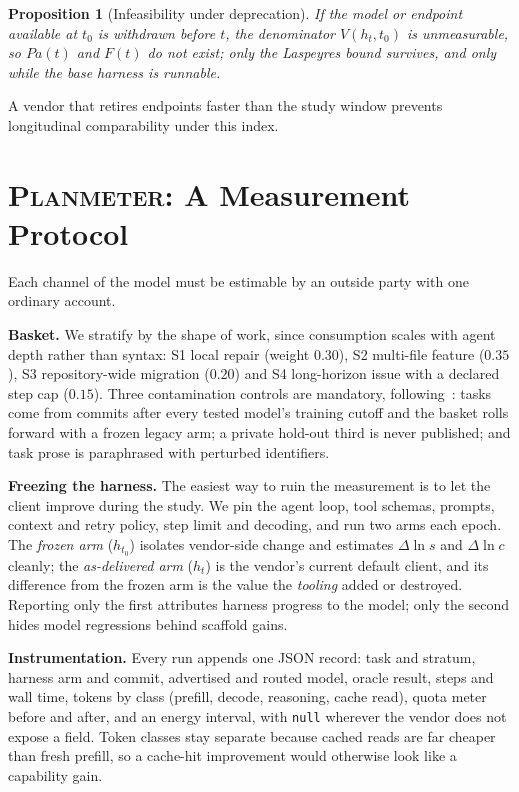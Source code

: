 \documentclass[conference]{IEEEtran}
\theoremstyle{plain}
\newtheorem{proposition}{Proposition}
\theoremstyle{definition}
\begin{document}
\begin{proposition}[Infeasibility under deprecation]
\label{prop:deprecation}
If the model or endpoint available at $t_0$ is withdrawn before $t$, the
denominator $V(h_t,t_0)$ is unmeasurable, so $Pa(t)$ and $F(t)$ do not exist;
only the Laspeyres bound survives, and only while the base harness is runnable.
\end{proposition}

A vendor that retires endpoints faster than the study window prevents
longitudinal comparability under this index.

\section{\textsc{Planmeter}: A Measurement Protocol}
\label{sec:protocol}

Each channel of the model must be estimable by an outside party with one
ordinary account.

\textbf{Basket.} We stratify by the shape of work, since consumption scales
with agent depth rather than syntax: S1 local repair (weight $0.30$), S2
multi-file feature ($0.35$), S3 repository-wide migration ($0.20$) and S4
long-horizon issue with a declared step cap ($0.15$). Three contamination
controls are mandatory, following~\cite{jain2025livecodebench}: tasks come
from commits after every tested model's training cutoff and the basket rolls
forward with a frozen legacy arm; a private hold-out third is never published;
and task prose is paraphrased with perturbed identifiers.

\textbf{Freezing the harness.}
\label{sec:harnessfix}
The easiest way to ruin the measurement is to let the client improve during
the study. We pin the agent loop, tool schemas, prompts, context and retry
policy, step limit and decoding, and run two arms each epoch. The \emph{frozen
arm} ($h_{t_0}$) isolates vendor-side change and estimates $\Delta\ln s$ and
$\Delta\ln c$ cleanly; the \emph{as-delivered arm} ($h_t$) is the vendor's
current default client, and its difference from the frozen arm is the value
the \emph{tooling} added or destroyed. Reporting only the first attributes
harness progress to the model; only the second hides model regressions behind
scaffold gains.

\textbf{Instrumentation.} Every run appends one JSON record: task and stratum,
harness arm and commit, advertised and routed model, oracle result, steps and
wall time, tokens by class (prefill, decode, reasoning, cache read), quota
meter before and after, and an energy interval, with \texttt{null} wherever the
vendor does not expose a field. Token classes stay separate because cached
reads are far cheaper than fresh prefill, so a cache-hit improvement would
otherwise look like a capability gain.
\end{document}
